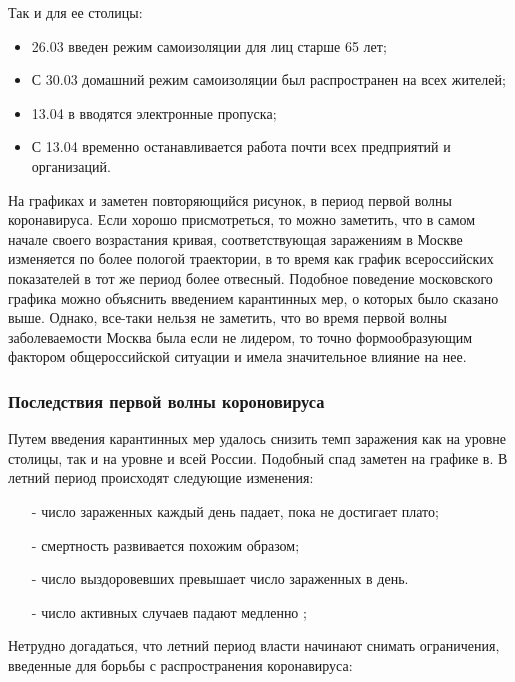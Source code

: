 \documentclass[a4paper, 12pt]{extarticle}
\begin{document}
Так и для ее столицы:

\begin{itemize}
    \item 26.03 введен режим самоизоляции для лиц старше 65 лет;
    \item С 30.03 домашний режим самоизоляции был распространен на
        всех жителей;
    \item 13.04 в вводятся электронные пропуска;
    \item С 13.04 временно останавливается работа почти всех предприятий и
        организаций.
\end{itemize}

\vspace{15pt}

На графиках   и
 заметен повторяющийся рисунок, в
период первой волны коронавируса. Если хорошо присмотреться, то можно заметить,
что в самом начале своего возрастания кривая, соответствующая заражениям в Москве
изменяется по более пологой траектории, в то время как график всероссийских
показателей в тот же период более
отвесный. Подобное поведение московского графика можно объяснить введением
карантинных мер, о которых было сказано выше. Однако, все-таки нельзя не
заметить, что во время первой волны заболеваемости Москва была если не лидером,
то точно формообразующим фактором общероссийской ситуации и имела значительное
влияние на нее.

\newpage

\subsubsection{Последствия первой волны короновируса}
Путем введения карантинных мер удалось снизить темп заражения как на уровне
столицы, так и на уровне и всей России. Подобный спад заметен на графике
 в. В летний период происходят следующие
изменения:
\begin{itemize}
    \item[-] число зараженных каждый день падает, пока не достигает плато;
    \item[-] смертность развивается похожим
        образом;
    \item[-] число выздоровевших превышает число зараженных в день.
    \item[-] число активных случаев падают медленно ;
\end{itemize}

Нетрудно догадаться, что летний период власти начинают снимать ограничения,
введенные для борьбы с распространения коронавируса:

\newpage

{}

\end{document}

